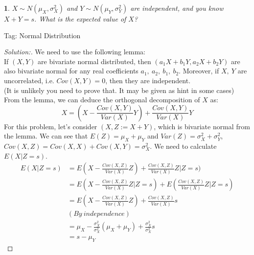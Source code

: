 \documentclass[10pt]{report}
\newtheorem{exe}{}[chapter]
\newenvironment{sol}{\begin{proof}[Solution:]}{\end{proof}}
\begin{document}
\begin{exe}
$X \sim N(\mu_X, \sigma_X^2)$ and $Y \sim N(\mu_Y, \sigma_Y^2)$ are independent, and you know $X + Y = s$. What is the expected value of $X$?
\end{exe}
\begin{teacher}
Tag: Normal Distribution
\begin{sol}
We need to use the following lemma:\\ 
If $(X, Y)$ are bivariate normal distributed, then $(a_1X+b_1Y, a_2X+b_2Y)$ are also bivariate normal for any real coefficients $a_1,\ a_2,\ b_1,\ b_2$. Moreover, if $X,\ Y$ are uncorrelated, i.e. $Cov(X, Y)=0$, then they are independent.\\
(It is unlikely you need to prove that. It may be given as hint in some cases)\\
From the lemma, we can deduce the orthogonal decomposition of $X$ as:
$$X=(X-\frac{Cov(X,Y)}{Var(X)}Y) + \frac{Cov(X,Y)}{Var(X)}Y$$
For this problem, let's consider $(X, Z:=X+Y)$, which is bivariate normal from the lemma. We can see that $E(Z) = \mu_X+\mu_Y$ and $Var(Z) = \sigma_X^2+\sigma_Y^2$, $Cov(X,Z)= Cov(X,X)+Cov(X,Y) = \sigma_X^2$. We need to calculate $E(X|Z=s)$.
\begin{align*}
    E(X|Z=s) &=E(X-\frac{Cov(X,Z)}{Var(X)}Z) + \frac{Cov(X,Z)}{Var(X)}Z|Z=s)\\
    &=E(X-\frac{Cov(X,Z)}{Var(X)}Z|Z=s) + E(\frac{Cov(X,Z)}{Var(X)}Z|Z=s)\\
    &=E(X-\frac{Cov(X,Z)}{Var(X)}Z)+\frac{Cov(X,Z)}{Var(X)}s\\
    &(By\ independence)\\
    &=\mu_X - \frac{\sigma_X^2}{\sigma_X^2}(\mu_X+\mu_Y) + \frac{\sigma_X^2}{\sigma_X^2}s\\
    &=s-\mu_Y
\end{align*}
\end{sol}
\end{teacher}
\end{document}
